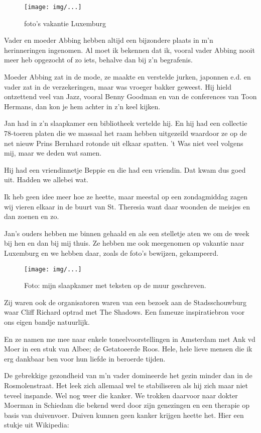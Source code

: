 \documentclass[10pt,twoside,openright]{memoir}
\begin{document}
\begin{figure}[t]
\texttt{[image: img/...]}
\caption{foto’s vakantie Luxemburg}
\end{figure}

Vader en moeder Abbing hebben altijd een bijzondere plaats in m’n herinneringen ingenomen. Al moet ik bekennen dat ik, vooral vader Abbing nooit meer heb opgezocht of zo iets, behalve dan bij z’n begrafenis. 

Moeder Abbing zat in de mode, ze maakte en verstelde jurken, japonnen e.d. en vader zat in de verzekeringen, maar was vroeger bakker geweest. Hij hield ontzettend veel van Jazz, vooral Benny Goodman en van de conferences van Toon Hermans, dan kon je hem achter in z’n keel kijken. 

Jan had in z’n slaapkamer een bibliotheek vertelde hij. En hij had een collectie 78-toeren platen die we massaal het raam hebben uitgezeild waardoor ze op de net nieuw Prins Bernhard rotonde uit elkaar spatten. ’t Was niet veel volgens mij, maar we deden wat samen. 

Hij had een vriendinnetje Beppie en die had een vriendin. Dat kwam dus goed uit. Hadden we allebei wat. 

Ik heb geen idee meer hoe ze heette, maar meestal op een zondagmiddag zagen wij vieren elkaar in de buurt van St. Theresia want daar woonden de meisjes en dan zoenen en zo.

Jan’s ouders hebben me binnen gehaald en als een stelletje aten we om de week bij hen en dan bij mij thuis. Ze hebben me ook meegenomen op vakantie naar Luxemburg en we hebben daar, zoals de foto’s bewijzen, gekampeerd. 

\begin{figure}[t]
\texttt{[image: img/...]}
\caption{Foto: mijn slaapkamer met teksten op de muur geschreven.}
\end{figure}

Zij waren ook de organisatoren waren van een bezoek aan de Stadsschouwburg waar Cliff Richard optrad met The Shadows. Een fameuze inspiratiebron voor ons eigen bandje natuurlijk. 

En ze namen me mee naar enkele toneelvoorstellingen in Amsterdam met Ank vd Moer in een stuk van Albee; de Getatoeerde Roos. Hele, hele lieve mensen die ik erg dankbaar ben voor hun liefde in beroerde tijden. 

De gebrekkige gezondheid van m’n vader domineerde het gezin minder dan in de Rosmolenstraat. Het leek zich allemaal wel te stabiliseren als hij zich maar niet teveel inspande. Wel nog weer die kanker. We trokken daarvoor naar dokter Moerman in Schiedam die bekend werd door zijn genezingen en een therapie op basis van duivenvoer. Duiven kunnen geen kanker krijgen heette het. Hier een stukje uit Wikipedia:
\end{document}
